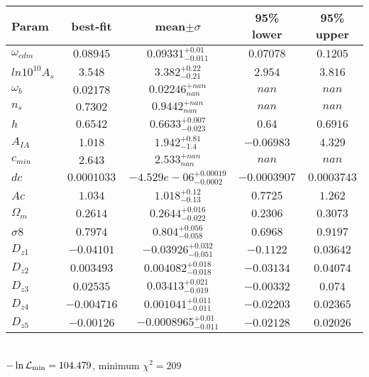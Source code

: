 \begin{tabular}{|l|c|c|c|c|} 
 \hline 
Param & best-fit & mean$\pm\sigma$ & 95\% lower & 95\% upper \\ \hline 
$\omega_{cdm }$ &$0.08945$ & $0.09331_{-0.011}^{+0.01}$ & $0.07078$ & $0.1205$ \\ 
$ln10^{10}A_{s }$ &$3.548$ & $3.382_{-0.21}^{+0.22}$ & $2.954$ & $3.816$ \\ 
$\omega_{b }$ &$0.02178$ & $0.02246_{nan}^{+nan}$ & $nan$ & $nan$ \\ 
$n_{s }$ &$0.7302$ & $0.9442_{nan}^{+nan}$ & $nan$ & $nan$ \\ 
$h$ &$0.6542$ & $0.6633_{-0.023}^{+0.007}$ & $0.64$ & $0.6916$ \\ 
$A_{IA }$ &$1.018$ & $1.942_{-1.4}^{+0.81}$ & $-0.06983$ & $4.329$ \\ 
$c_{min }$ &$2.643$ & $2.533_{nan}^{+nan}$ & $nan$ & $nan$ \\ 
$dc$ &$0.0001033$ & $-4.529e-06_{-0.0002}^{+0.00019}$ & $-0.0003907$ & $0.0003743$ \\ 
$Ac$ &$1.034$ & $1.018_{-0.13}^{+0.12}$ & $0.7725$ & $1.262$ \\ 
$\Omega_{m }$ &$0.2614$ & $0.2644_{-0.022}^{+0.016}$ & $0.2306$ & $0.3073$ \\ 
$\sigma8$ &$0.7974$ & $0.804_{-0.058}^{+0.056}$ & $0.6968$ & $0.9197$ \\ 
$D_{z1 }$ &$-0.04101$ & $-0.03926_{-0.051}^{+0.032}$ & $-0.1122$ & $0.03642$ \\ 
$D_{z2 }$ &$0.003493$ & $0.004082_{-0.018}^{+0.018}$ & $-0.03134$ & $0.04074$ \\ 
$D_{z3 }$ &$0.02535$ & $0.03413_{-0.019}^{+0.021}$ & $-0.00332$ & $0.074$ \\ 
$D_{z4 }$ &$-0.004716$ & $0.001041_{-0.011}^{+0.011}$ & $-0.02203$ & $0.02365$ \\ 
$D_{z5 }$ &$-0.00126$ & $-0.0008965_{-0.011}^{+0.01}$ & $-0.02128$ & $0.02026$ \\ 
\hline 
 \end{tabular} \\ 
$-\ln{\cal L}_\mathrm{min} =104.479$, minimum $\chi^2=209$ \\ 
